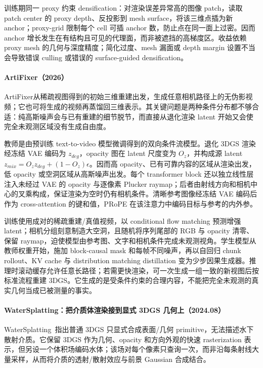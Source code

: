 训练期同一 proxy 约束 densification：对渲染误差异常高的图像 patch，读取 patch center 的 proxy depth、反投影到 mesh surface，将该三维点插为新 anchor；proxy-grid 限制每个 cell 可插 anchor 数，防止点在同一面上过密。因而 anchor 增长发生在有结构且可见的代理面，而非被遮挡的高梯度区。收益依赖 proxy mesh 的几何与深度精度；简化过度、mesh 漏面或 depth margin 设置不当会导致错误 culling 或错误的 surface-guided densification。

\paragraph{ArtiFixer（2026）\cite{2603_00492}}
ArtiFixer从稀疏视图得到的初始三维重建出发，生成任意相机路径上的无伪影视频；它也可将生成的视频再蒸馏回三维表示。其关键问题是两种条件分布都不够合适：纯高斯噪声会与已有重建的细节脱节，而直接从退化渲染 latent 开始又会使完全未观测区域没有生成自由度。

教师是由预训练 text-to-video 模型微调得到的双向条件流模型。退化 3DGS 渲染经冻结 VAE 编码为 $z_{deg}$，opacity 图在 latent 尺度变为 $O_z$，并构成源 latent $z_{mix}=O_z z_{deg}+(1-O_z)\epsilon$。因而高 opacity、已有可靠内容的区域从渲染出发，低 opacity 或空洞区域从高斯噪声出发。每个 transformer block 还以独立线性层注入未经过 VAE 的 opacity 与逐像素 Plucker raymap；后者由射线方向和相机中心的叉乘构成，保证渲染为空时仍有相机条件。清晰参考图像经冻结 VAE 编码后作为 cross-attention 的键和值，PRoPE 在该注意力中编码目标与参考的内外参。

训练使用成对的稀疏重建/真值视频，以 conditional flow matching 预测增强 latent；相机分组刻意制造大空洞，且随机将序列尾部的 RGB 与 opacity 清零、保留 raymap，迫使模型由参考图、文字和相机条件完成未观测视角。学生模型从教师权重开始，施加 block-causal mask 和每帧不同噪声，再以自回归 chunk rollout、KV cache 与 distribution matching distillation 变为少步因果生成器。推理时滚动缓存允许任意长路径；若需更快渲染，可一次生成一组一致的新视图后按标准流程重建 3DGS。它生成的是受条件约束的合理内容，不能把完全未观测的真实几何当成已被测量的事实。

\paragraph{WaterSplatting：把介质体渲染接到显式 3DGS 几何上（2024.08）}
WaterSplatting~\cite{2408_08206}指出普通 3DGS 只显式合成表面/几何 primitive，无法描述水下散射介质。它保留 3DGS 作为几何、opacity 和方向外观的快速 rasterization 表示，但另设一个体积场编码水体；该场对每个像素只查询一次，而非沿每条射线大量采样，从而将介质的透射/散射效应与前景 Gaussian 合成结合。

